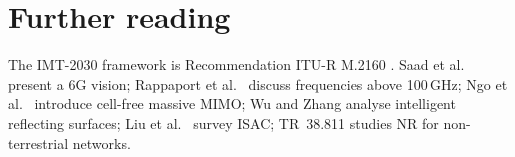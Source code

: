 \documentclass[11pt,a4paper]{article}
\begin{document}
\section{Further reading}
The IMT-2030 framework is Recommendation ITU-R M.2160 \cite{itu2023m2160}. Saad et al.\ \cite{saad2020vision} present a 6G vision; Rappaport et al.\
\cite{rappaport2019above100} discuss frequencies above 100\,GHz; Ngo et al.\ \cite{ngo2017cellfree} introduce cell-free massive MIMO; Wu and Zhang \cite{wu2019irs}
analyse intelligent reflecting surfaces; Liu et al.\ \cite{liu2022isac} survey ISAC; TR~38.811 \cite{tr38811} studies NR for non-terrestrial networks.

\printbibliography[heading=subbibliography,title={\ACNstrRefs}]
\end{document}
